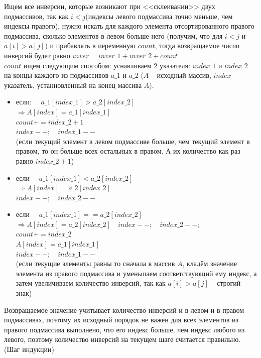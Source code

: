 \documentclass[a4paper,12pt]{article} %
\begin{document}
Ищем все инверсии, которые возникают при <<склеивании>>  двух подмассивов, так как $ i<j $(индексы левого подмассива точно меньше, чем индексы правого), нужно искать для каждого элемента отсортированного правого подмассива, сколько элементов в левом больше него (получим, что для $ i<j $ и $ a[i] > a[j] $) и прибавлять в переменную $ count $, тогда возвращаемое число инверсий будет равно $ inver = inver\_1+inver\_2+count $\\
$ count $  ищем следующим способом: уснавливаем 2 указателя: $ index\_1  $ и $ index\_2 $ на концы каждого из подмассивов $ a\_1 $ и $ a\_2 $  ($ A $ -- исходный массив, $ index $ -- указатель, устанновленный на конец массива $ A $). 
\begin{itemize}
\item если: $\quad a\_1[index\_1] > a\_2[index\_2] $\\
$ \Rightarrow A[index] = a\_1[index\_1] $ \\
$ count += index\_2 + 1$ \\
$ index -- ; \quad index\_1 --$\\
(если текущий элемент в левом подмассиве больше, чем текущий элемент в правом, то он больше всех остальных в правом. А их количество как раз равно  $ index\_2 + 1$)
\item если $\quad a\_1[index\_1] < a\_2[index\_2] $ \\
$ \Rightarrow A[index] = a\_2[index\_2] $ \\
$ index -- ; \quad index\_2 --$
\item если $\quad a\_1[index\_1] == a\_2[index\_2] $ \\
$ \Rightarrow A[index] = a\_2[index\_2] \quad index--; \quad index\_2--;$ \\
$ count += index\_2 $ \\
$A[index] = a\_1[index\_1]$ \\
$ index -- ; \quad index\_1 --$ \\
(если текущие элементы равны то сначала в массив $ A $, кладём значение элемента из правого подмассива и уменьшаем соответствующий ему индекс, а затем увеличиваем количество инверсий, так как $ a[i] > a[j] $ -- строгий знак)
\end{itemize}
Возвращаемое значение учитывает количество инверсий и в левом и в правом подмассивах, поэтому их исходный порядок не важен для всех элементов из правого подмассива выполнено, что его индекс больше, чем индекс любого из левого, поэтому количество инверсий на текущем шаге считается правильно. (Шаг индукции)\\
\end{document}
